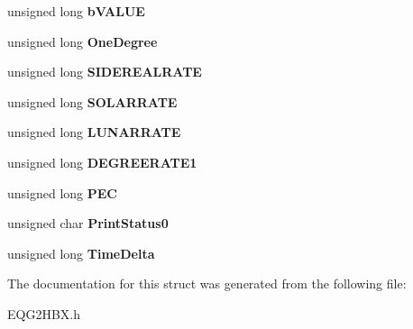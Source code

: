\begin{DoxyCompactItemize}
unsigned long {\bfseries b\+V\+A\+L\+UE}
\item 
\mbox{\label{structaxis__type_a6d408f8c18ab3a8b6fd42c45d383a537}} 
unsigned long {\bfseries One\+Degree}
\item 
\mbox{\label{structaxis__type_a9671b2224c205a2ef87dd17b9e9379bc}} 
unsigned long {\bfseries S\+I\+D\+E\+R\+E\+A\+L\+R\+A\+TE}
\item 
\mbox{\label{structaxis__type_a2e077c5c6409615751a079f9e4f1b5e3}} 
unsigned long {\bfseries S\+O\+L\+A\+R\+R\+A\+TE}
\item 
\mbox{\label{structaxis__type_a20669e06299050ac114615b3d816455a}} 
unsigned long {\bfseries L\+U\+N\+A\+R\+R\+A\+TE}
\item 
\mbox{\label{structaxis__type_a1b1780f04321b5903b8f97c17b5db039}} 
unsigned long {\bfseries D\+E\+G\+R\+E\+E\+R\+A\+T\+E1}
\item 
\mbox{\label{structaxis__type_ab9221caecffb15e528d1d843ee1e1ccf}} 
unsigned long {\bfseries P\+EC}
\item 
\mbox{\label{structaxis__type_ad36f04c29f39500cb5361501052a891d}} 
unsigned char {\bfseries Print\+Status0}
\item 
\mbox{\label{structaxis__type_a2bfeb2429981e220e649898a4edfa9a3}} 
unsigned long {\bfseries Time\+Delta}
\end{DoxyCompactItemize}


The documentation for this struct was generated from the following file\+:\begin{DoxyCompactItemize}
\item 
E\+Q\+G2\+H\+B\+X.\+h\end{DoxyCompactItemize}
